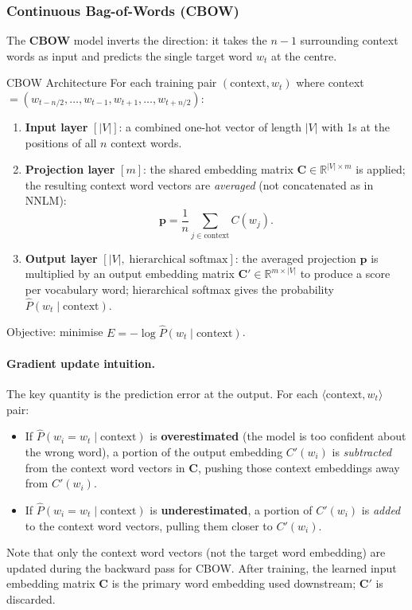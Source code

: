 \documentclass[11pt,a4paper]{article}
\newcommand{\term}[1]{\textcolor{DefGreen}{\textbf{#1}}}
\begin{document}
\subsubsection{Continuous Bag-of-Words (CBOW)}

The \term{CBOW} model inverts the direction: it takes the $n-1$ surrounding context words as input and predicts the single target word $w_t$ at the centre.

\begin{thmbox}{CBOW Architecture}
For each training pair $(\text{context}, w_t)$ where context $= (w_{t-n/2}, \ldots, w_{t-1}, w_{t+1}, \ldots, w_{t+n/2})$:
\begin{enumerate}
  \item \textbf{Input layer} $[|V|]$: a combined one-hot vector of length $|V|$ with 1s at the positions of all $n$ context words.
  \item \textbf{Projection layer} $[m]$: the shared embedding matrix $\mathbf{C} \in \mathbb{R}^{|V| \times m}$ is applied; the resulting context word vectors are \emph{averaged} (not concatenated as in NNLM):
  \[
    \mathbf{p} = \frac{1}{n}\sum_{j \in \text{context}} C(w_j).
  \]
  \item \textbf{Output layer} $[|V|,\;\text{hierarchical softmax}]$: the averaged projection $\mathbf{p}$ is multiplied by an output embedding matrix $\mathbf{C}' \in \mathbb{R}^{m \times |V|}$ to produce a score per vocabulary word; hierarchical softmax gives the probability $\hat{P}(w_t \mid \text{context})$.
\end{enumerate}
Objective: minimise $E = -\log \hat{P}(w_t \mid \text{context})$.
\end{thmbox}

\paragraph{Gradient update intuition.} The key quantity is the prediction error at the output. For each $\langle\text{context}, w_t\rangle$ pair:
\begin{itemize}
  \item If $\hat{P}(w_i = w_t \mid \text{context})$ is \textbf{overestimated} (the model is too confident about the wrong word), a portion of the output embedding $C'(w_i)$ is \emph{subtracted} from the context word vectors in $\mathbf{C}$, pushing those context embeddings away from $C'(w_i)$.
  \item If $\hat{P}(w_i = w_t \mid \text{context})$ is \textbf{underestimated}, a portion of $C'(w_i)$ is \emph{added} to the context word vectors, pulling them closer to $C'(w_i)$.
\end{itemize}
Note that only the context word vectors (not the target word embedding) are updated during the backward pass for CBOW. After training, the learned input embedding matrix $\mathbf{C}$ is the primary word embedding used downstream; $\mathbf{C}'$ is discarded.
\end{document}
